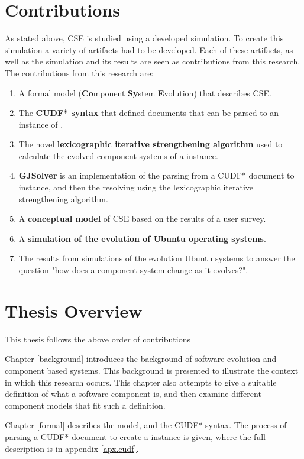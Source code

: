 \section{Contributions}
As stated above, CSE is studied using a developed simulation.
To create this simulation a variety of artifacts had to be developed.
Each of these artifacts, as well as the simulation and its results are seen as contributions from this research. 
The contributions from this research are:
\begin{enumerate}
  \item A formal model \textbf{\modelname} (\textbf{Co}mponent \textbf{Sy}stem \textbf{E}volution) that describes CSE. 
  \item The \textbf{CUDF* syntax} that defined documents that can be parsed to an instance of \modelname.
  \item The novel \textbf{lexicographic iterative strengthening algorithm} used to calculate the evolved component systems of a \modelname instance.
  \item \textbf{GJSolver} is an implementation of the parsing from a CUDF* document to \modelname instance, and then the resolving using the lexicographic iterative strengthening algorithm.
  \item A \textbf{conceptual model} of CSE based on the results of a user survey. 
  \item A \textbf{simulation of the evolution of Ubuntu operating systems}.
  \item The results from simulations of the evolution Ubuntu systems to answer the question "how does a component system change as it evolves?".
\end{enumerate}

\section{Thesis Overview}
This thesis follows the above order of contributions

Chapter \ref{background} introduces the background of software evolution and component based systems.
This background is presented to illustrate the context in which this research occurs.
This chapter also attempts to give a suitable definition of what a software component is, and then examine different component models that fit such a definition.

Chapter \ref{formal} describes the \modelname model, and the CUDF* syntax.
The process of parsing a CUDF* document to create a \modelname instance is given, where the full description is in appendix \ref{apx.cudf}.

